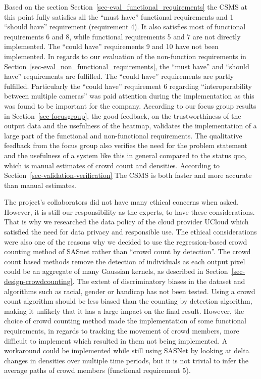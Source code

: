 \documentclass[
]{article}
\begin{document}
Based on the section Section~\ref{sec-eval_functional_requirements} the
CSMS at this point fully satisfies all the ``must have'' functional
requirements and 1 ``should have'' requirement (requirement 4). It also
satisfies most of functional requirements 6 and 8, while functional
requirements 5 and 7 are not directly implemented. The ``could have''
requirements 9 and 10 have not been implemented. In regards to our
evaluation of the non-function requirements in
Section~\ref{sec-eval_non_functional_requirements}, the ``must have''
and ``should have'' requirements are fulfilled. The ``could have''
requirements are partly fulfilled. Particularly the ``could have''
requirement 6 regarding ``interoperability between multiple cameras''
was paid attention during the implementation as this was found to be
important for the company. According to our focus group results in
Section~\ref{sec-focusgroup}, the good feedback, on the trustworthiness
of the output data and the usefulness of the heatmap, validates the
implementation of a large part of the functional and non-functional
requirements. The qualitative feedback from the focus group also
verifies the need for the problem statement and the usefulness of a
system like this in general compared to the status quo, which is manual
estimates of crowd count and densities. According to
Section~\ref{sec-validation-verification} The CSMS is both faster and
more accurate than manual estimates.

The project's collaborators did not have many ethical concerns when
asked. However, it is still our responsibility as the experts, to have
these considerations. That is why we researched the data policy of the
cloud provider UCloud which satisfied the need for data privacy and
responsible use. The ethical considerations were also one of the reasons
why we decided to use the regression-based crowd counting method of
SASnet rather than ``crowd count by detection''. The crowd count based
methods remove the detection of individuals as each output pixel could
be an aggregate of many Gaussian kernels, as described in
Section~\ref{sec-design-crowdcounting}. The extent of discriminatory
biases in the dataset and algorithms such as racial, gender or handicap
has not been tested. Using a crowd count algorithm should be less biased
than the counting by detection algorithm, making it unlikely that it has
a large impact on the final result. However, the choice of crowd
counting method made the implementation of some functional requirements,
in regards to tracking the movement of crowd members, more difficult to
implement which resulted in them not being implemented. A workaround
could be implemented while still using SASNet by looking at delta
changes in densities over multiple time periods, but it is not trivial
to infer the average paths of crowd members (functional requirement 5).
\end{document}
